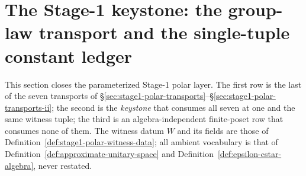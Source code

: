 \section{The Stage-1 keystone: the group-law transport and the single-tuple constant ledger}\label{sec:stage1-ledger-keystone}

This section closes the parameterized Stage-1 polar layer. The first row is the last of the
seven transports of \S\ref{sec:stage1-polar-transports}--\S\ref{sec:stage1-polar-transports-ii};
the second is the \emph{keystone} that consumes all seven at one and the same witness tuple;
the third is an algebra-independent finite-poset row that consumes none of them. The witness
datum $W$ and its fields are those of Definition~\ref{def:stage1-polar-witness-data}; all
ambient vocabulary is that of Definition~\ref{def:approximate-unitary-space} and
Definition~\ref{def:epsilon-cstar-algebra}, never restated.

